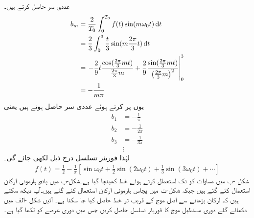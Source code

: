 عددی سر  حاصل کرتے ہیں۔
\begin{align*}
b_m&=\frac{2}{T_0}\int_0^{T_0} f(t)\sin(m\omega_0 t) \dif t\\
&=\frac{2}{3}\int_0^3 \frac{t}{3}\sin (m\frac{2\pi}{3} t) \dif t\\
&=\left.-\frac{2}{9}t\frac{\cos(\frac{2\pi}{3}mt)}{\frac{2\pi}{3}m}+\frac{2}{9}\frac{\sin(\frac{2\pi}{3}mt)}{\left(\frac{2\pi}{3}m\right)^2}\right|_0^3\\
&=-\frac{1}{m\pi}
\end{align*}
یوں  پر کرتے ہوئے عددی سر حاصل ہوتے ہیں یعنی
\begin{align*}
b_1&=-\frac{1}{\pi}\\
b_2&=-\frac{1}{2\pi}\\
b_3&=-\frac{1}{3\pi}\\
&\vdots
\end{align*}
لہٰذا فوریئر تسلسل درج ذیل لکھی جائے گی۔
\begin{align}\label{مساوات_فوریئر_دندان_موج}
f(t)=\frac{1}{2}-\frac{1}{\pi}\left[\sin \omega_0 t+\frac{1}{2} \sin (2\omega_0 t) +\frac{1}{3} \sin (3\omega_0 t)+\cdots\right]
\end{align}
شکل -ب میں  مساوات  کو  تک استعمال کرتے ہوئے خط کھینچا گیا ہے۔شکل-پ میں پانچ ہارمونی ارکان استعمال کئے گئے ہیں جبکہ شکل-ت میں پچاس ہارمونی ارکان استعمال کئے گئے ہیں۔آپ دیکھ سکتے ہیں کہ ارکان بڑھانے سے اصل موج کے قریب تر خط حاصل کیا جا سکتا ہے۔
آئیں شکل -الف  میں دکھائے گئے  دوری مستطیل موج کا فوریئر تسلسل حاصل کریں جس میں دوری عرصے کو  لکھا گیا ہے۔
